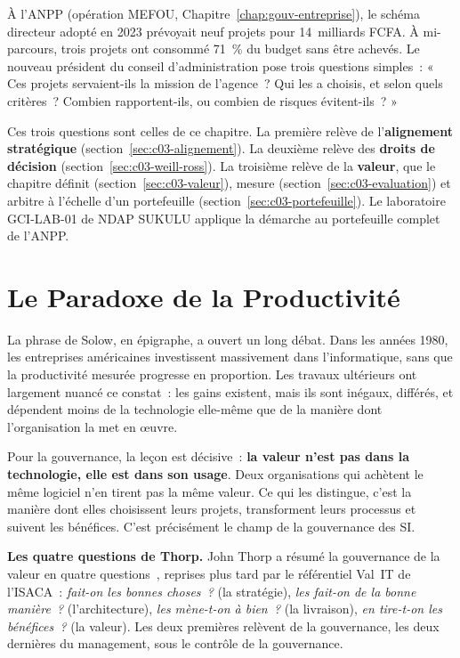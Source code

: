 À l'ANPP (opération MEFOU, Chapitre~\ref{chap:gouv-entreprise}), le
schéma directeur adopté en 2023 prévoyait neuf projets pour 14~milliards
FCFA. À mi-parcours, trois projets ont consommé 71~\% du budget sans être
achevés. Le nouveau président du conseil d'administration pose trois
questions simples~: « Ces projets servaient-ils la mission de l'agence~?
Qui les a choisis, et selon quels critères~? Combien rapportent-ils, ou
combien de risques évitent-ils~? »

Ces trois questions sont celles de ce chapitre. La première relève de
l'\textbf{alignement stratégique} (section~\ref{sec:c03-alignement}). La
deuxième relève des \textbf{droits de décision}
(section~\ref{sec:c03-weill-ross}). La troisième relève de la
\textbf{valeur}, que le chapitre définit (section~\ref{sec:c03-valeur}),
mesure (section~\ref{sec:c03-evaluation}) et arbitre à l'échelle d'un
portefeuille (section~\ref{sec:c03-portefeuille}). Le laboratoire GCI-LAB-01
de NDAP SUKULU applique la démarche au portefeuille complet de l'ANPP.

\separateur

\section{Le Paradoxe de la Productivité}
\label{sec:c03-paradoxe}

La phrase de Solow, en épigraphe, a ouvert un long débat. Dans les années
1980, les entreprises américaines investissent massivement dans
l'informatique, sans que la productivité mesurée progresse en proportion.
Les travaux ultérieurs ont largement nuancé ce constat~: les gains
existent, mais ils sont inégaux, différés, et dépendent moins de la
technologie elle-même que de la manière dont l'organisation la met en
œuvre.

Pour la gouvernance, la leçon est décisive~: \textbf{la valeur n'est pas
dans la technologie, elle est dans son usage}. Deux organisations qui
achètent le même logiciel n'en tirent pas la même valeur. Ce qui les
distingue, c'est la manière dont elles choisissent leurs projets,
transforment leurs processus et suivent les bénéfices. C'est précisément
le champ de la gouvernance des SI.

\begin{boxinfo}
\textbf{Les quatre questions de Thorp.} John Thorp a résumé la
gouvernance de la valeur en quatre questions~\cite{thorp1998paradox},
reprises plus tard par le référentiel Val~IT de l'ISACA~:
\emph{fait-on les bonnes choses~?} (la stratégie), \emph{les fait-on de la
bonne manière~?} (l'architecture), \emph{les mène-t-on à bien~?} (la
livraison), \emph{en tire-t-on les bénéfices~?} (la valeur). Les deux
premières relèvent de la gouvernance, les deux dernières du management,
sous le contrôle de la gouvernance.
\end{boxinfo}

